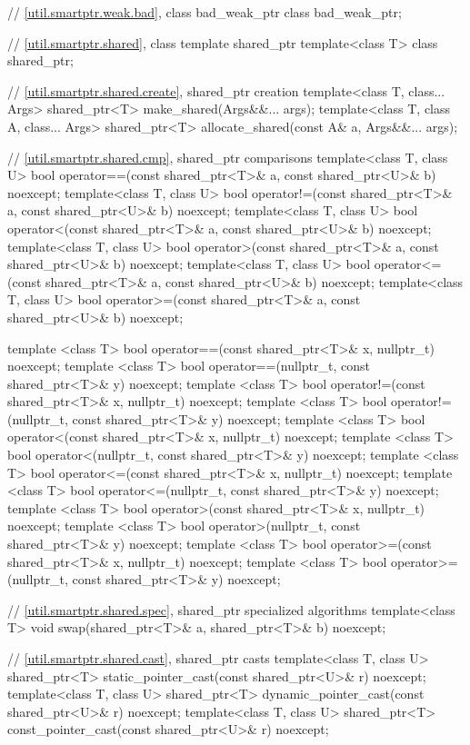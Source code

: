 \begin{codeblock}
{  // \ref{util.smartptr.weak.bad}, class bad_weak_ptr
  class bad_weak_ptr;

  // \ref{util.smartptr.shared}, class template shared_ptr
  template<class T> class shared_ptr;

  // \ref{util.smartptr.shared.create}, shared_ptr creation
  template<class T, class... Args>
    shared_ptr<T> make_shared(Args&&... args);
  template<class T, class A, class... Args>
    shared_ptr<T> allocate_shared(const A& a, Args&&... args);

  // \ref{util.smartptr.shared.cmp}, shared_ptr comparisons
  template<class T, class U>
    bool operator==(const shared_ptr<T>& a, const shared_ptr<U>& b) noexcept;
  template<class T, class U>
    bool operator!=(const shared_ptr<T>& a, const shared_ptr<U>& b) noexcept;
  template<class T, class U>
    bool operator<(const shared_ptr<T>& a, const shared_ptr<U>& b) noexcept;
  template<class T, class U>
    bool operator>(const shared_ptr<T>& a, const shared_ptr<U>& b) noexcept;
  template<class T, class U>
    bool operator<=(const shared_ptr<T>& a, const shared_ptr<U>& b) noexcept;
  template<class T, class U>
    bool operator>=(const shared_ptr<T>& a, const shared_ptr<U>& b) noexcept;

  template <class T>
    bool operator==(const shared_ptr<T>& x, nullptr_t) noexcept;
  template <class T>
    bool operator==(nullptr_t, const shared_ptr<T>& y) noexcept;
  template <class T>
    bool operator!=(const shared_ptr<T>& x, nullptr_t) noexcept;
  template <class T>
    bool operator!=(nullptr_t, const shared_ptr<T>& y) noexcept;
  template <class T>
    bool operator<(const shared_ptr<T>& x, nullptr_t) noexcept;
  template <class T>
    bool operator<(nullptr_t, const shared_ptr<T>& y) noexcept;
  template <class T>
    bool operator<=(const shared_ptr<T>& x, nullptr_t) noexcept;
  template <class T>
    bool operator<=(nullptr_t, const shared_ptr<T>& y) noexcept;
  template <class T>
    bool operator>(const shared_ptr<T>& x, nullptr_t) noexcept;
  template <class T>
    bool operator>(nullptr_t, const shared_ptr<T>& y) noexcept;
  template <class T>
    bool operator>=(const shared_ptr<T>& x, nullptr_t) noexcept;
  template <class T>
    bool operator>=(nullptr_t, const shared_ptr<T>& y) noexcept;

  // \ref{util.smartptr.shared.spec}, shared_ptr specialized algorithms
  template<class T>
    void swap(shared_ptr<T>& a, shared_ptr<T>& b) noexcept;

  // \ref{util.smartptr.shared.cast}, shared_ptr casts
  template<class T, class U>
    shared_ptr<T> static_pointer_cast(const shared_ptr<U>& r) noexcept;
  template<class T, class U>
    shared_ptr<T> dynamic_pointer_cast(const shared_ptr<U>& r) noexcept;
  template<class T, class U>
    shared_ptr<T> const_pointer_cast(const shared_ptr<U>& r) noexcept;

}
\end{codeblock}
